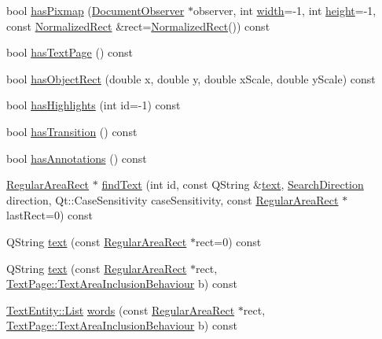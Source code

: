 \begin{DoxyCompactItemize}
\item 
bool \hyperlink{classOkular_1_1Page_a4c14959c8283b76513d4ba4139634575}{has\+Pixmap} (\hyperlink{classOkular_1_1DocumentObserver}{Document\+Observer} $\ast$observer, int \hyperlink{classOkular_1_1Page_a57114e88281da2a51b1bb0d5d4996d53}{width}=-\/1, int \hyperlink{classOkular_1_1Page_a67246a32b3e625946eb5c685b8372a4f}{height}=-\/1, const \hyperlink{classOkular_1_1NormalizedRect}{Normalized\+Rect} \&rect=\hyperlink{classOkular_1_1NormalizedRect}{Normalized\+Rect}()) const 
\item 
bool \hyperlink{classOkular_1_1Page_a44163bc0e76204a9d9c42da442ee734a}{has\+Text\+Page} () const 
\item 
bool \hyperlink{classOkular_1_1Page_a43e9934eaf7e89f5a8a03b06166c2f35}{has\+Object\+Rect} (double x, double y, double x\+Scale, double y\+Scale) const 
\item 
bool \hyperlink{classOkular_1_1Page_a002e372614cada96c47fa7f74b25ce77}{has\+Highlights} (int id=-\/1) const 
\item 
bool \hyperlink{classOkular_1_1Page_a278cc1910a6ce74d8b8e1963ae62a579}{has\+Transition} () const 
\item 
bool \hyperlink{classOkular_1_1Page_a7e7a1039febaed410867e5b3d30ef6c7}{has\+Annotations} () const 
\item 
\hyperlink{classOkular_1_1RegularAreaRect}{Regular\+Area\+Rect} $\ast$ \hyperlink{classOkular_1_1Page_a02f1143ff5c69b04f4b514c04566864f}{find\+Text} (int id, const Q\+String \&\hyperlink{classOkular_1_1Page_a11ab0f2abe5c1e760c046a33fd5393f3}{text}, \hyperlink{namespaceOkular_ad7ede3c5a1b1a8bfd83f133e7e3ed9d2}{Search\+Direction} direction, Qt\+::\+Case\+Sensitivity case\+Sensitivity, const \hyperlink{classOkular_1_1RegularAreaRect}{Regular\+Area\+Rect} $\ast$last\+Rect=0) const 
\item 
Q\+String \hyperlink{classOkular_1_1Page_a11ab0f2abe5c1e760c046a33fd5393f3}{text} (const \hyperlink{classOkular_1_1RegularAreaRect}{Regular\+Area\+Rect} $\ast$rect=0) const 
\item 
Q\+String \hyperlink{classOkular_1_1Page_ab79aac8e44db33759c403caab7fb87ae}{text} (const \hyperlink{classOkular_1_1RegularAreaRect}{Regular\+Area\+Rect} $\ast$rect, \hyperlink{classOkular_1_1TextPage_a07b135c84863f18df1d08e95aeeffd34}{Text\+Page\+::\+Text\+Area\+Inclusion\+Behaviour} b) const 
\item 
\hyperlink{classOkular_1_1TextEntity_a9deacb4422ede69001915b33ca21c023}{Text\+Entity\+::\+List} \hyperlink{classOkular_1_1Page_a7857b61d285bd959fa617a19f25c5f7c}{words} (const \hyperlink{classOkular_1_1RegularAreaRect}{Regular\+Area\+Rect} $\ast$rect, \hyperlink{classOkular_1_1TextPage_a07b135c84863f18df1d08e95aeeffd34}{Text\+Page\+::\+Text\+Area\+Inclusion\+Behaviour} b) const 

\end{DoxyCompactItemize}
